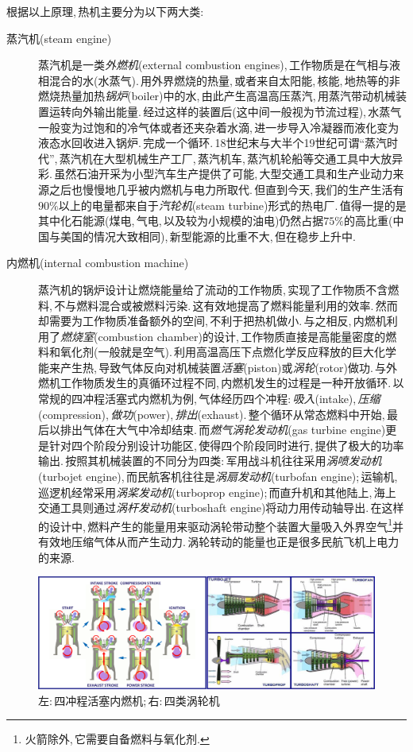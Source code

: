 根据以上原理,\,热机主要分为以下两大类:
\begin{description}
	\item[\hei 蒸汽机(steam engine)]  蒸汽机是一类\emph{外燃机}(external combustion engines),\,工作物质是在气相与液相混合的水(水蒸气).\,用外界燃烧的热量,\,或者来自太阳能,\,核能,\,地热等的非燃烧热量加热\emph{锅炉}(boiler)中的水,\,由此产生高温高压蒸汽,\,用蒸汽带动机械装置运转向外输出能量.\,经过这样的装置后(这中间一般视为节流过程),\,水蒸气一般变为过饱和的冷气体或者还夹杂着水滴,\,进一步导入冷凝器而液化变为液态水回收进入锅炉.\,完成一个循环.\,18世纪末与大半个19世纪可谓``蒸汽时代'',\,蒸汽机在大型机械生产工厂,\,蒸汽机车,\,蒸汽机轮船等交通工具中大放异彩.\,虽然石油开采为小型汽车生产提供了可能,\,大型交通工具和生产业动力来源之后也慢慢地几乎被内燃机与电力所取代.\,但直到今天,\,我们的生产生活有$90\%$以上的电量都来自于\emph{汽轮机}(steam turbine)形式的热电厂.\,值得一提的是其中化石能源(煤电,\,气电,\,以及较为小规模的油电)仍然占据$75\%$的高比重(中国与美国的情况大致相同),\,新型能源的比重不大,\,但在稳步上升中.
	\item[\hei 内燃机(internal combustion machine)]  蒸汽机的锅炉设计让燃烧能量给了流动的工作物质,\,实现了工作物质不含燃料,\,不与燃料混合或被燃料污染.\,这有效地提高了燃料能量利用的效率.\,然而却需要为工作物质准备额外的空间,\,不利于把热机做小.\,与之相反,\,内燃机利用了\emph{燃烧室}(combustion chamber)的设计,\,工作物质直接是高能量密度的燃料和氧化剂(一般就是空气).\,利用高温高压下点燃化学反应释放的巨大化学能来产生热,\,导致气体反向对机械装置\ca \emph{活塞}(piston)或\emph{涡轮}(rotor)做功.\,与外燃机工作物质发生的真循环过程不同,\,内燃机发生的过程是一种开放循环.\,以常规的四冲程活塞式内燃机为例,\,气体经历四个冲程:\,\emph{吸入}(intake),\,\emph{压缩}(compression),\,\emph{做功}(power),\,\emph{排出}(exhaust).\,整个循环从常态燃料中开始,\,最后以排出气体在大气中冷却结束.\,而\emph{燃气涡轮发动机}(gas turbine engine)更是针对四个阶段分别设计功能区,\,使得四个阶段同时进行,\,提供了极大的功率输出.\,按照其机械装置的不同分为四类:\,军用战斗机往往采用\emph{涡喷发动机}(turbojet engine),\,而民航客机往往是\emph{涡扇发动机}(turbofan engine);\,运输机,\,巡逻机经常采用\emph{涡桨发动机}(turboprop engine);\,而直升机和其他陆上,\,海上交通工具则通过\emph{涡杆发动机}(turboshaft engine)将动力用传动轴导出.\,在这样的设计中,\,燃料产生的能量用来驱动涡轮带动整个装置大量吸入外界空气\footnote{火箭除外,\,它需要自备燃料与氧化剂.}并有效地压缩气体从而产生动力.\,涡轮转动的能量也正是很多民航飞机上电力的来源.
\end{description}
\begin{figure}[H]
\centering
\includegraphics[width=17cm]{image/5-2-3.png}
\caption{左:\,四冲程活塞内燃机;\,右:\,四类涡轮机}
\end{figure}


